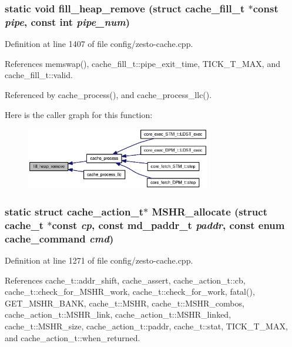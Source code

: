 \subsubsection[{fill\_\-heap\_\-remove}]{\setlength{\rightskip}{0pt plus 5cm}static void fill\_\-heap\_\-remove (struct {\bf cache\_\-fill\_\-t} $\ast$const  {\em pipe}, \/  const int {\em pipe\_\-num})\hspace{0.3cm}{\tt  [static]}}\label{config_2zesto-cache_8cpp_9c8931eb6f26a4862221d39dd688368f}




Definition at line 1407 of file config/zesto-cache.cpp.

References memswap(), cache\_\-fill\_\-t::pipe\_\-exit\_\-time, TICK\_\-T\_\-MAX, and cache\_\-fill\_\-t::valid.

Referenced by cache\_\-process(), and cache\_\-process\_\-llc().

Here is the caller graph for this function:\nopagebreak
\begin{figure}[H]
\begin{center}
\leavevmode
\includegraphics[width=229pt]{config_2zesto-cache_8cpp_9c8931eb6f26a4862221d39dd688368f_icgraph}
\end{center}
\end{figure}
\subsubsection[{MSHR\_\-allocate}]{\setlength{\rightskip}{0pt plus 5cm}static struct {\bf cache\_\-action\_\-t}$\ast$ MSHR\_\-allocate (struct {\bf cache\_\-t} $\ast$const  {\em cp}, \/  const {\bf md\_\-paddr\_\-t} {\em paddr}, \/  const enum {\bf cache\_\-command} {\em cmd})\hspace{0.3cm}{\tt  [static, read]}}\label{config_2zesto-cache_8cpp_b9e90f1afc77db8eb4dad712b12304ac}




Definition at line 1271 of file config/zesto-cache.cpp.

References cache\_\-t::addr\_\-shift, cache\_\-assert, cache\_\-action\_\-t::cb, cache\_\-t::check\_\-for\_\-MSHR\_\-work, cache\_\-t::check\_\-for\_\-work, fatal(), GET\_\-MSHR\_\-BANK, cache\_\-t::MSHR, cache\_\-t::MSHR\_\-combos, cache\_\-action\_\-t::MSHR\_\-link, cache\_\-action\_\-t::MSHR\_\-linked, cache\_\-t::MSHR\_\-size, cache\_\-action\_\-t::paddr, cache\_\-t::stat, TICK\_\-T\_\-MAX, and cache\_\-action\_\-t::when\_\-returned.

